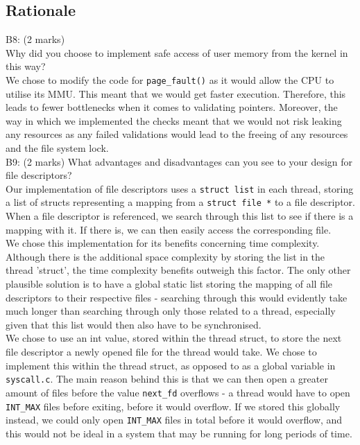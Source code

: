 \documentclass[11pt, a4paper]{article}
\begin{document}
\subsection{Rationale}
B8: (2 marks)\\
Why did you choose to implement safe access of user memory from the kernel in this
way?\bigskip\\
We chose to modify the code for \verb|page_fault()| as it would allow the CPU to utilise
its MMU. This meant that we would get faster execution. Therefore, this leads to fewer
bottlenecks when it comes to validating pointers. Moreover, the way in which we implemented
the checks meant that we would not risk leaking any resources as any failed validations
would lead to the freeing of any resources and the file system lock.\bigskip\\
B9: (2 marks)
What advantages and disadvantages can you see to your design for file descriptors?\bigskip\\
Our implementation of file descriptors uses a \verb|struct list| in each thread, storing a
list of structs representing a mapping from a \verb|struct file *| to a file descriptor.
When a file descriptor is referenced, we search through this list to see if there is a
mapping with it. If there is, we can then easily access the corresponding file.\\
We chose this implementation for its benefits concerning time complexity. Although there is
the additional space complexity by storing the list in the thread 'struct', the time
complexity benefits outweigh this factor. The only other plausible solution is to have a
global static list storing the mapping of all file descriptors to their respective files - 
searching through this would evidently take much longer than searching through only those
related to a thread, especially given that this list would then also have to be synchronised.\\
We chose to use an int value, stored within the thread struct, to store the next file
descriptor a newly opened file for the thread would take. We chose to implement this
within the thread struct, as opposed to as a global variable in \verb|syscall.c|.
The main reason behind this is that we can then open a greater amount of
files before the value \verb|next_fd| overflows - a thread would have to open
\verb|INT_MAX| files before exiting, before it would overflow. If we stored this
globally instead, we could only open \verb|INT_MAX| files in total before it would overflow,
and this would not be ideal in a system that may be running for long periods of time.
\end{document}
